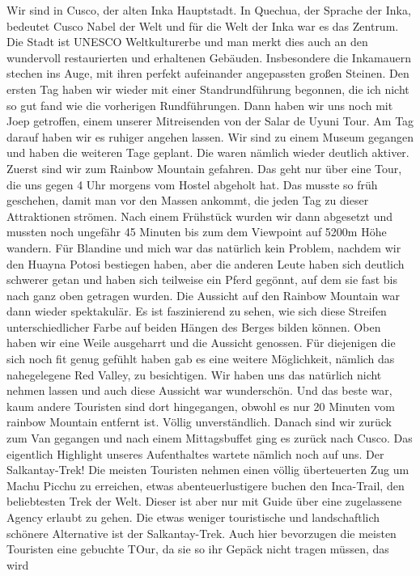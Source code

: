 \documentclass[11pt]{book}
\begin{document}
Wir sind in Cusco, der alten Inka Hauptstadt. In Quechua, der Sprache der Inka, bedeutet Cusco Nabel der Welt und für die Welt der Inka war es das 
Zentrum. Die Stadt ist UNESCO Weltkulturerbe und man merkt dies auch an den wundervoll restaurierten und erhaltenen Gebäuden. Insbesondere die Inkamauern 
stechen ins Auge, mit ihren perfekt aufeinander angepassten großen Steinen. Den ersten Tag haben wir wieder mit einer Standrundführung begonnen, die ich 
nicht so gut fand wie die vorherigen Rundführungen. Dann haben wir uns noch mit Joep getroffen, einem unserer Mitreisenden von der Salar de Uyuni Tour. 
Am Tag darauf haben wir es ruhiger angehen lassen. Wir sind zu einem Museum gegangen und haben die weiteren Tage geplant. Die waren nämlich wieder 
deutlich aktiver. 
Zuerst sind wir zum Rainbow Mountain gefahren. Das geht nur über eine Tour, die uns gegen 4 Uhr morgens vom Hostel abgeholt hat. Das musste so früh 
geschehen, damit man vor den Massen ankommt, die jeden Tag zu dieser Attraktionen strömen. Nach einem Frühstück wurden wir dann abgesetzt und mussten 
noch ungefähr 45 Minuten bis zum dem Viewpoint auf 5200m Höhe wandern. Für Blandine und mich war das natürlich kein Problem, nachdem wir den Huayna Potosi 
bestiegen haben, aber die anderen Leute haben sich deutlich schwerer getan und haben sich teilweise ein Pferd gegönnt, auf dem sie fast bis nach ganz oben 
getragen wurden. Die Aussicht auf den Rainbow Mountain war dann wieder spektakulär. Es ist faszinierend zu sehen, wie sich diese Streifen unterschiedlicher 
Farbe auf beiden Hängen des Berges bilden können. Oben haben wir eine Weile ausgeharrt und die Aussicht genossen. Für diejenigen die sich noch fit genug 
gefühlt haben gab es eine weitere Möglichkeit, nämlich das nahegelegene Red Valley, zu besichtigen. Wir haben uns das natürlich nicht nehmen lassen und 
auch diese Aussicht war wunderschön. Und das beste war, kaum andere Touristen sind dort hingegangen, obwohl es nur 20 Minuten vom rainbow Mountain entfernt 
ist. Völlig unverständlich. Danach sind wir zurück zum Van gegangen und nach einem Mittagsbuffet ging es zurück nach Cusco. Das eigentlich Highlight unseres 
Aufenthaltes wartete nämlich noch auf uns. 
Der Salkantay-Trek! Die meisten Touristen nehmen einen völlig überteuerten Zug um Machu Picchu zu erreichen, etwas abenteuerlustigere buchen den Inca-Trail, den 
beliebtesten Trek der Welt. Dieser ist aber nur mit Guide über eine zugelassene Agency erlaubt zu gehen. Die etwas weniger touristische und landschaftlich 
schönere Alternative ist der Salkantay-Trek. Auch hier bevorzugen die meisten Touristen eine gebuchte TOur, da sie so ihr Gepäck nicht tragen müssen, das wird 
\end{document}
